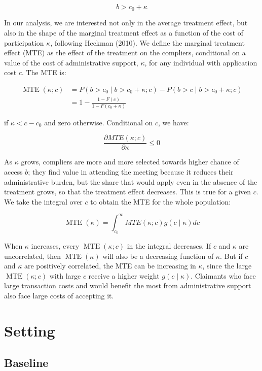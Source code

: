 \documentclass[
]{article}
\begin{document}
\[
b>c_0+\kappa
\]

In our analysis, we are interested not only in the average treatment effect, but also in the shape of the marginal treatment effect as a function of the cost of participation \(\kappa\), following Heckman (2010). We define the marginal treatment effect (MTE) as the effect of the treatment on the compliers, conditional on a value of the cost of administrative support, \(\kappa\), for any individual with application cost \(c\). The MTE is:

\[
\begin{aligned}
\operatorname{MTE}(\kappa ; c) & =P\left(b>c_0 \mid b>c_0+\kappa ; c\right)-P\left(b>c \mid b>c_0+\kappa ; c\right) \\
& =1-\frac{1-F(c)}{1-F\left(c_0+\kappa\right)}
\end{aligned}
\]

if \(\kappa<c-c_0\) and zero otherwise. Conditional on \(c\), we have:

\[
\frac{\partial M T E(\kappa ; c)}{\partial \kappa} \leq 0
\]

As \(\kappa\) grows, compliers are more and more selected towards higher chance of access \(b\); they find value in attending the meeting because it reduces their administrative burden, but the share that would apply even in the absence of the treatment grows, so that the treatment effect decreases. This is true for a given \(c\). We take the integral over \(c\) to obtain the MTE for the whole population:

\[
\operatorname{MTE}(\kappa)=\int_{c_0}^{\infty} M T E(\kappa ; c) g(c \mid \kappa) d c
\]

When \(\kappa\) increases, every \(\operatorname{MTE}(\kappa ; c)\) in the integral decreases. If \(c\) and \(\kappa\) are uncorrelated, then \(\operatorname{MTE}(\kappa)\) will also be a decreasing function of \(\kappa\). But if \(c\) and \(\kappa\) are positively correlated, the MTE can be increasing in \(\kappa\), since the large \(\operatorname{MTE}(\kappa ; c)\) with large \(c\) receive a higher weight \(g(c \mid \kappa)\). Claimants who face large transaction costs and would benefit the most from administrative support also face large costs of accepting it.

\section{Setting}\label{setting}

\subsection{Baseline}\label{baseline}
\end{document}
